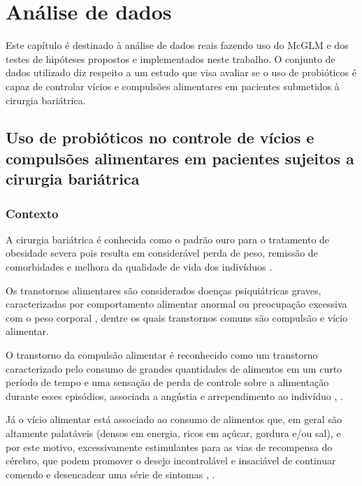 
\chapter{Análise de dados}\label{cap:aplicacao}


Este capítulo é destinado à análise de dados reais fazendo uso do McGLM e dos testes de hipóteses propostos e implementados neste trabalho. O conjunto de dados utilizado diz respeito a um estudo que visa avaliar se o uso de probióticos é capaz de controlar vícios e compulsões alimentares em pacientes submetidos à cirurgia bariátrica.


\section{Uso de probióticos no controle de vícios e compulsões alimentares em pacientes sujeitos a cirurgia bariátrica}


\subsection{Contexto}

A cirurgia bariátrica é conhecida como o padrão ouro para o tratamento de obesidade severa pois resulta em considerável perda de peso, remissão de comorbidades e melhora da qualidade de vida dos indivíduos \citep{mechanick2020clinical}.

Os transtornos alimentares são considerados doenças psiquiátricas graves, caracterizadas por comportamento alimentar anormal ou preocupação excessiva com o peso corporal \citep{treasure2020eating}, dentre os quais transtornos comuns são compulsão e vício alimentar.

O transtorno da compulsão alimentar é reconhecido como um transtorno caracterizado pelo consumo de grandes quantidades de alimentos em um curto período de tempo e uma sensação de perda de controle sobre a alimentação durante esses episódios, associada a angústia e arrependimento ao indivíduo \citep{sarmiento2020diagnostic}, \citep{wilfley2016characteristics}.

Já o vício alimentar está associado ao consumo de alimentos que, em geral são altamente palatáveis (densos em energia, ricos em açúcar, gordura e/ou sal), e por este motivo, excessivamente estimulantes para as vias de recompensa do cérebro, que podem promover o desejo incontrolável e insaciável de continuar comendo e desencadear uma série de sintomas \citep{avena2012further}, \citep{najem2020prevalence}.

